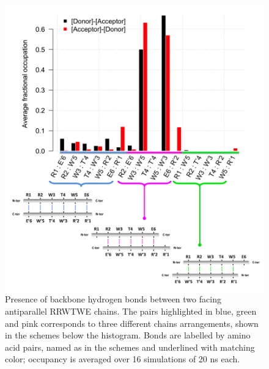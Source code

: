 \begin{figure}
\centering
\includegraphics[width=0.9\linewidth]{3results_capsule/pics/merged_figures_beta_sheet2}
\caption[Hydrogen bonds in a RRWTWE $\beta$-sheet]{Presence of backbone hydrogen bonds between two facing antiparallel RRWTWE chains. The pairs highlighted in blue, green and pink corresponds to three different chains arrangements, shown in the schemes below the histogram. Bonds are labelled by amino acid pairs, named as in the schemes and underlined with matching color; occupancy is averaged over 16 simulations of 20 ns each.}
\label{fig:hb_beta_SIhere_hb}
\end{figure}


